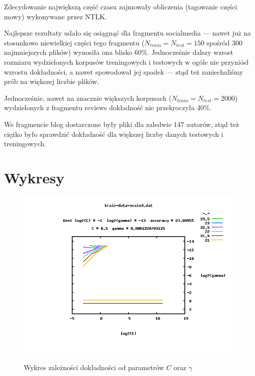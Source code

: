 \documentclass{article}
\begin{document}
Zdecydowanie największą część czasu zajmowały obliczenia (tagowanie części mowy) wykonywane przez NTLK.

Najlepsze rezultaty udało się osiągnąć dla fragmentu socialmedia --- nawet już na stosunkowo niewielkiej części tego fragmentu ($N_{train} = N_{test} =150$ spośród 300 najmniejszych plików) wynosiła ona blisko 60\%. Jednocześnie dalszy wzrost rozmiaru wydzielonych korpusów treningowych i testowych w ogóle nie przyniósł wzrostu dokładności, a nawet spowodował jej spadek --- stąd też zaniechaliśmy prób na większej liczbie plików.

Jednocześnie, nawet na znacznie większych korpusach ($N_{train} = N_{test} = 2000$) wydzielonych z fragmentu reviews dokładność nie przekroczyła 40\%. 

We fragmencie blog dostarczone były pliki dla zaledwie 147 autorów, stąd też ciężko było sprawdzić dokładność dla większej liczby danych testowych i treningowych.


\section{Wykresy}

\begin{figure}[h]
\centering
\includegraphics[scale=0.8]{logc_loggamma_acc}\label{fig:chart}
\caption{Wykres zależności dokładności od parametrów $C$ oraz $\gamma$}
\end{figure}
\end{document}
